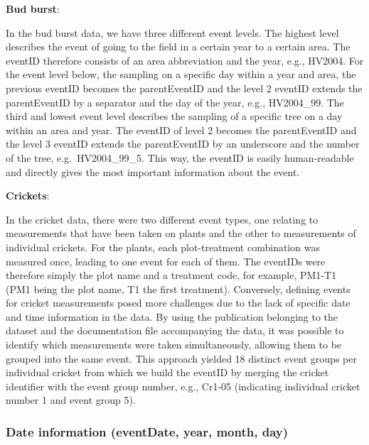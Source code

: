 \documentclass[
  oneside]{book}
\begin{document}
\begin{examplebox}

\textbf{Bud burst}:

In the bud burst data, we have three different event levels. The highest level describes the event of going to the field in a certain year to a certain area. The eventID therefore consists of an area abbreviation and the year, e.g., HV2004. For the event level below, the sampling on a specific day within a year and area, the previous eventID becomes the parentEventID and the level 2 eventID extends the parentEventID by a separator and the day of the year, e.g., HV2004\_99. The third and lowest event level describes the sampling of a specific tree on a day within an area and year. The eventID of level 2 becomes the parentEventID and the level 3 eventID extends the parentEventID by an underscore and the number of the tree, e.g.~HV2004\_99\_5. This way, the eventID is easily human-readable and directly gives the most important information about the event.

\end{examplebox}

\begin{examplebox}

\textbf{Crickets}:

In the cricket data, there were two different event types, one relating to measurements that have been taken on plants and the other to measurements of individual crickets. For the plants, each plot-treatment combination was measured once, leading to one event for each of them. The eventIDs were therefore simply the plot name and a treatment code, for example, PM1-T1 (PM1 being the plot name, T1 the first treatment). Conversely, defining events for cricket measurements posed more challenges due to the lack of specific date and time information in the data. By using the publication belonging to the dataset and the documentation file accompanying the data, it was possible to identify which measurements were taken simultaneously, allowing them to be grouped into the same event. This approach yielded 18 distinct event groups per individual cricket from which we build the eventID by merging the cricket identifier with the event group number, e.g., Cr1-05 (indicating individual cricket number 1 and event group 5).

\end{examplebox}

\subsubsection{Date information (eventDate, year, month, day)}\label{date-information-eventdate-year-month-day}
\end{document}
